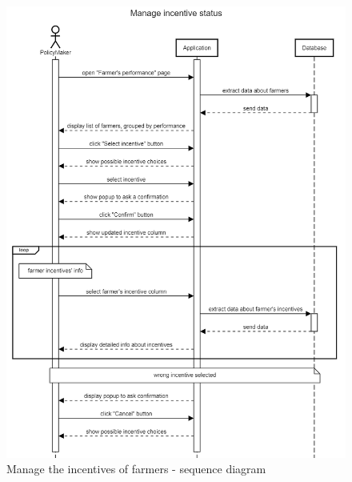 \begin{figure}[H]
    \centering
    \includegraphics[scale=0.5]{Images/Sequence diagrams/SE2 - manage incentive status (pm).png}
    \caption{Manage the incentives of farmers - sequence diagram}
    \label{fig:my_label}
\end{figure}

